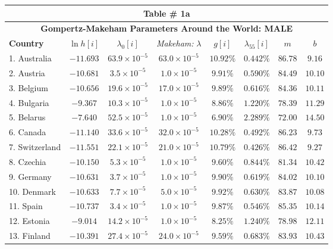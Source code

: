 \documentclass[12pt, titlepage]{article}%
\begin{document}
\clearpage
\begin{table}
\begin{center}
\begin{tabular}{||l|c|c|c|c|c|c|c||}
\hline\hline
\multicolumn{8}{||c||}{Table \# 1a } \\ \hline\hline
\multicolumn{8}{||c||}{{\bf Gompertz-Makeham Parameters Around the World: MALE}} \\ \hline\hline
{\bf Country} & $\ln h[i]$ & $\lambda_{0}[i]$ & {\em Makeham:} $\lambda$ & $g[i]$ & $\lambda_{55}[i]$ & $m$ & $b$ \\ \hline \hline
1. Australia &  $-11.693$ & $63.9\times10^{-5}$ & $63.0\times10^{-5}$ & $10.92\%$ & $0.442\%$ & $86.78$ & $9.16$\\ \hline
2. Austria &  $-10.681$ & $3.5\times10^{-5}$ & $1.0\times10^{-5}$ & $9.91\%$ & $0.590\%$ & $84.49$ & $10.10$\\ \hline
3. Belgium &  $-10.656$ & $19.6\times10^{-5}$ & $17.0\times10^{-5}$ & $9.89\%$ & $0.616\%$ & $84.36$ & $10.11$\\ \hline
4. Bulgaria &  $-9.367$ & $10.3\times10^{-5}$ & $1.0\times10^{-5}$ & $8.86\%$ & $1.220\%$ & $78.39$ & $11.29$\\ \hline
5. Belarus &  $-7.640$ & $52.5\times10^{-5}$ & $1.0\times10^{-5}$ & $6.90\%$ & $2.289\%$ & $72.00$ & $14.50$\\ \hline
6. Canada &  $-11.140$ & $33.6\times10^{-5}$ & $32.0\times10^{-5}$ & $10.28\%$ & $0.492\%$ & $86.23$ & $9.73$\\ \hline
7. Switzerland &  $-11.551$ & $22.1\times10^{-5}$ & $21.0\times10^{-5}$ & $10.79\%$ & $0.426\%$ & $86.42$ & $9.27$\\ \hline
8. Czechia &  $-10.150$ & $5.3\times10^{-5}$ & $1.0\times10^{-5}$ & $9.60\%$ & $0.844\%$ & $81.34$ & $10.42$\\ \hline
9. Germany &  $-10.631$ & $3.7\times10^{-5}$ & $1.0\times10^{-5}$ & $9.90\%$ & $0.619\%$ & $84.02$ & $10.10$\\ \hline
10. Denmark &  $-10.633$ & $7.7\times10^{-5}$ & $5.0\times10^{-5}$ & $9.92\%$ & $0.630\%$ & $83.87$ & $10.08$\\ \hline
11. Spain &  $-10.737$ & $3.4\times10^{-5}$ & $1.0\times10^{-5}$ & $9.87\%$ & $0.546\%$ & $85.35$ & $10.14$\\ \hline
12. Estonia &  $-9.014$ & $14.2\times10^{-5}$ & $1.0\times10^{-5}$ & $8.25\%$ & $1.240\%$ & $78.98$ & $12.11$\\ \hline
13. Finland &  $-10.391$ & $27.4\times10^{-5}$ & $24.0\times10^{-5}$ & $9.59\%$ & $0.683\%$ & $83.93$ & $10.43$\\ \hline

\end{tabular}
\end{center}
\end{table}
\end{document}
